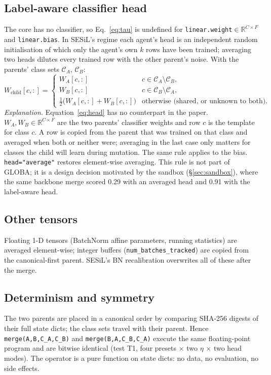 \documentclass[11pt,a4paper]{article}
\newcommand{\code}[1]{\texttt{#1}}
\begin{document}
\subsection{Label-aware classifier head}
\label{sec:head}
The core has no classifier, so Eq.~\ref{eq:tau} is undefined for \code{linear.weight}$\in\mathbb{R}^{C\times F}$ and \code{linear.bias}. In SESiL's regime each agent's head is an independent random initialisation of which only the agent's own $k$ rows have been trained; averaging two heads dilutes every trained row with the other parent's noise. With the parents' class sets $\mathcal{C}_A$, $\mathcal{C}_B$:
\begin{equation}
W_{\mathrm{child}}[c,:] =
\begin{cases}
W_A[c,:] & c\in\mathcal{C}_A\setminus\mathcal{C}_B,\\
W_B[c,:] & c\in\mathcal{C}_B\setminus\mathcal{C}_A,\\
\tfrac12\bigl(W_A[c,:]+W_B[c,:]\bigr) & \text{otherwise (shared, or unknown to both).}
\end{cases}
\label{eq:head}
\end{equation}
\emph{Explanation.} Equation~\ref{eq:head} has no counterpart in the paper. $W_A,W_B\in\mathbb{R}^{C\times F}$ are the two parents' classifier weights and row $c$ is the template for class $c$. A row is copied from the parent that was trained on that class and averaged when both or neither were; averaging in the last case only matters for classes the child will learn during mutation. The same rule applies to the bias. \code{head="average"} restores element-wise averaging. This rule is not part of GLOBA; it is a design decision motivated by the sandbox (\S\ref{sec:sandbox}), where the same backbone merge scored 0.29 with an averaged head and 0.91 with the label-aware head.

\subsection{Other tensors}
Floating 1-D tensors (BatchNorm affine parameters, running statistics) are averaged element-wise; integer buffers (\code{num\_batches\_tracked}) are copied from the canonical-first parent. SESiL's BN recalibration overwrites all of these after the merge.

\subsection{Determinism and symmetry}
\label{sec:determinism}
The two parents are placed in a canonical order by comparing SHA-256 digests of their full state dicts; the class sets travel with their parent. Hence \code{merge(A,B,C\_A,C\_B)} and \code{merge(B,A,C\_B,C\_A)} execute the same floating-point program and are bitwise identical (test T1, four presets $\times$ two $\eta$ $\times$ two head modes). The operator is a pure function on state dicts: no data, no evaluation, no side effects.
\end{document}
